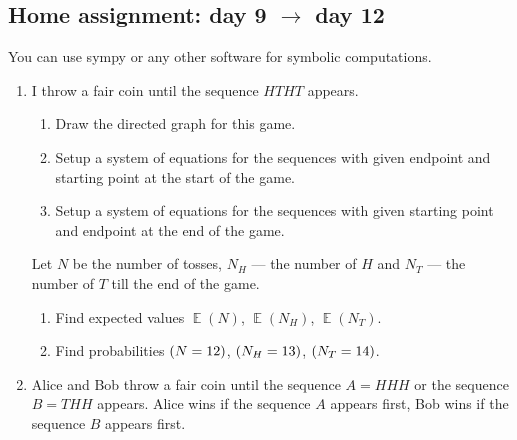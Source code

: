 \documentclass[12pt]{article}
\let\P\relax
\DeclareMathOperator{\P}{\mathbb{P}}
\DeclareMathOperator{\E}{\mathbb{E}}
\begin{document}
\begin{exercise}
\end{exercise}

\subsection*{Home assignment: day 9 $\to$ day 12}

You can use sympy or any other software for symbolic computations.

\begin{enumerate}
\item I throw a fair coin until the sequence $HTHT$ appears.

\begin{enumerate}[label=\alph*)]
    \item Draw the directed graph for this game.
    \item Setup a system of equations for the sequences with given endpoint and starting point at the start of the game. 
    \item Setup a system of equations for the sequences with given starting point and endpoint at the end of the game. 
\end{enumerate}
Let $N$ be the number of tosses, $N_H$ — the number of $H$ and $N_T$ — the number of $T$ till the end of the game. 
\begin{enumerate}[label=\alph*), resume]
    \item Find expected values $\E(N)$, $\E(N_H)$, $\E(N_T)$.
    \item Find probabilities $\P(N = 12)$, $\P(N_H = 13)$, $\P(N_T = 14)$.
\end{enumerate}
    \item Alice and Bob throw a fair coin until the sequence $A = HHH$ or the sequence $B = THH$ appears.
Alice wins if the sequence $A$ appears first, Bob wins if the sequence $B$ appears first.


\end{enumerate}
\end{document}

